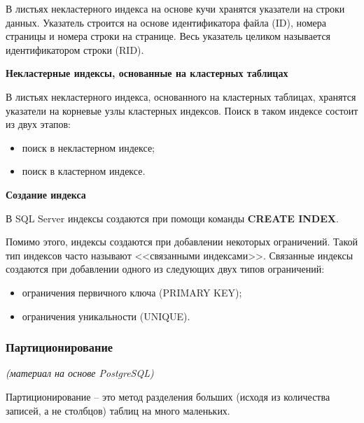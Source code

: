 В листьях некластерного индекса на основе кучи хранятся указатели на строки данных. Указатель строится на основе идентификатора файла (ID), номера страницы и номера строки на странице. Весь указатель целиком называется идентификатором строки (RID).

\textbf{Некластерные индексы, основанные на кластерных таблицах}

В листьях некластерного индекса, основанного на кластерных таблицах, хранятся указатели на корневые узлы кластерных индексов. Поиск в таком индексе состоит из двух этапов:

\begin{itemize}
	\item поиск в некластерном индексе;
	\item поиск в кластерном индексе.
\end{itemize}

\textbf{Создание индекса}

В SQL Server индексы создаются при помощи команды \textbf{CREATE INDEX}.

Помимо этого, индексы создаются при добавлении некоторых ограничений. Такой тип индексов часто называют <<связанными индексами>>. Связанные индексы создаются при добавлении одного из следующих двух типов ограничений: 
\begin{itemize}
	\item ограничения первичного ключа (PRIMARY KEY); 
	\item ограничения уникальности (UNIQUE). 
\end{itemize}

\subsubsection{Партиционирование}
\textit{(материал на основе PostgreSQL)}

Партиционирование – это метод разделения больших (исходя из количества записей, а не столбцов) таблиц на много маленьких.

